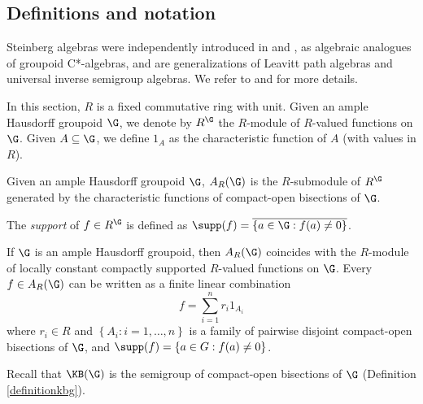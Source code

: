 \subsection{Definitions and notation}

Steinberg algebras were independently introduced in \cite{MR2565546} and \cite{MR3274831}, as algebraic analogues of groupoid C*-algebras, and are generalizations of Leavitt path algebras and universal inverse semigroup algebras. We refer to \cite{MR3743184} and \cite{MR3848066} for more details.

In this section, $R$ is a fixed commutative ring with unit. Given an ample Hausdorff groupoid $\G$, we denote by $R^{\G}$ the $R$-module of $R$-valued functions on $\G$. Given $A\subseteq\G$, we define $1_A$ as the characteristic function of $A$ (with values in $R$).

\begin{definition}[{\cite[Definition 4.1]{MR2565546}}]
Given an ample Hausdorff groupoid $\G$, $A_R(\G)$ is the $R$-submodule of $R^{\G}$ generated by the characteristic functions of compact-open bisections of $\G$.
\end{definition}

The \emph{support} of $f\in R^{\G}$ is defined as $\supp(f)=\overline{\left\{a\in\G:f(a)\neq 0\right\}}$.

\begin{proposition}[{\cite[Lemma 3.3.]{MR3274831}}]
If $\G$ is an ample Hausdorff groupoid, then $A_R(\G)$ coincides with the $R$-module of locally constant compactly supported $R$-valued functions on $\G$. Every $f\in A_R(\G)$ can be written as a finite linear combination
\[f=\sum_{i=1}^n r_i1_{A_i}\]
where $r_i\in R$ and $\left\{A_i:i=1,\ldots,n\right\}$ is a family of pairwise disjoint compact-open bisections of $\G$, and $\supp(f)=\left\{a\in G:f(a)\neq 0\right\}$.
\end{proposition}

Recall that $\KB(\G)$ is the semigroup of compact-open bisections of $\G$ (Definition \ref{definitionkbg}).

